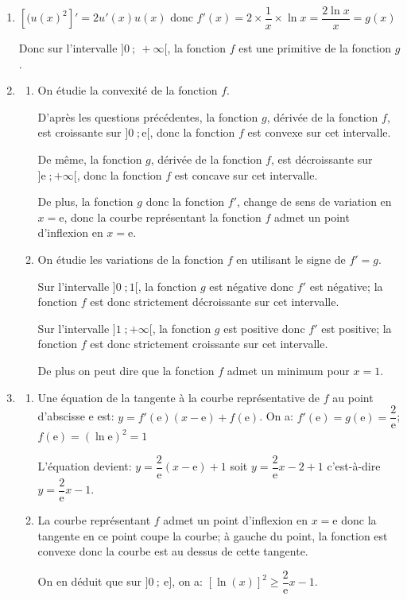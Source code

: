\documentclass[10pt]{article}
\providecommand{\e}{{\mathrm{e}}}
\begin{document}
\begin{enumerate}
\item 
$[(u(x)^2]' = 2u'(x)u(x)$ donc
$f'(x)= 2\times \dfrac{1}{x}\times \ln x = \dfrac{2\ln x}{x}=g(x)$

Donc sur l'intervalle $]0~;~+ \infty[$, la fonction $f$ est une primitive de la fonction $g$.

\item 
	\begin{enumerate}
		\item On étudie la convexité de la fonction $f$.
		
D'après les questions précédentes, la fonction $g$, dérivée de la fonction $f$, est croissante sur $]0\;; \e[$, donc la fonction $f$ est convexe sur cet intervalle.		
		
De même, la fonction $g$, dérivée de la fonction $f$, est décroissante sur $]\e\;; +\infty[$, donc la fonction $f$ est concave sur cet intervalle.

De plus, la fonction $g$ donc la fonction $f'$, change de sens de variation en $x=\e$, donc la courbe représentant la fonction $f$ admet un point d'inflexion en $x=\e$.
		
		\item On étudie les variations de la fonction $f$ en utilisant le signe de $f'=g$.
		
Sur l'intervalle $]0\;; 1[$, la fonction $g$ est négative donc $f'$ est négative; la fonction $f$ est donc strictement décroissante sur cet intervalle.

Sur l'intervalle $]1\;; +\infty[$, la fonction $g$ est positive donc $f'$ est positive; la fonction $f$ est donc strictement croissante sur cet intervalle.

De plus on peut dire que la fonction $f$ admet un minimum pour $x=1$.
		
\end{enumerate}
\item 
	\begin{enumerate}
		\item Une équation de la tangente à la courbe représentative de $f$ au point d'abscisse e est: $y=f'(\e)\left (x-\e\right )+f(\e)$. On a: $f'(\e) = g(\e)=\dfrac{2}{\e}$; $f(\e)=\left (\ln\e\right )^2=1$

L'équation devient: $y=\dfrac{2}{\e}\left (x-\e\right ) +1$ soit
$y=\dfrac{2}{\e}x -2+1$ c'est-à-dire $y=\dfrac{2}{\e}x-1$.
		
		\item 
La courbe représentant $f$ admet un point d'inflexion en $x=\e$ donc la tangente en ce point coupe la courbe; à gauche du point, la fonction est convexe donc la courbe est au dessus de cette tangente.

On en déduit que sur  $]0~;~\e]$, on a: $[\ln (x)]^2 \geqslant \dfrac{2}{\e}x - 1.$

	\end{enumerate}
\end{enumerate}

\bigskip
\end{document}
